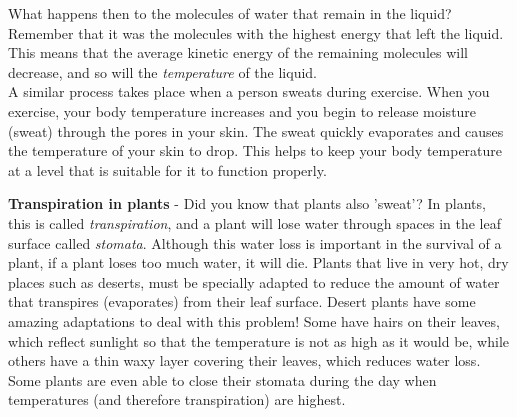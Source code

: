 \begin{itemize}
{What happens then to the molecules of water that remain in the liquid? Remember that it was the molecules with the highest energy that left the liquid. This means that the average kinetic energy of the remaining molecules will decrease, and so will the \textit{temperature} of the liquid.\\

A similar process takes place when a person sweats during exercise. When you exercise, your body temperature increases and you begin to release moisture (sweat) through the pores in your skin. The sweat quickly evaporates and causes the temperature of your skin to drop. This helps to keep your body temperature at a level that is suitable for it to function properly.}
\end{itemize}

\begin{IFact}{\textbf{Transpiration in plants} - Did you know that plants also 'sweat'? In plants, this is called \textit{transpiration}, and a plant will lose water through spaces in the leaf surface called \textit{stomata}. Although this water loss is important in the survival of a plant, if a plant loses too much water, it will die. Plants that live in very hot, dry places such as deserts, must be specially adapted to reduce the amount of water that transpires (evaporates) from their leaf surface. Desert plants have some amazing adaptations to deal with this problem! Some have hairs on their leaves, which reflect sunlight so that the temperature is not as high as it would be, while others have a thin waxy layer covering their leaves, which reduces water loss. Some plants are even able to close their stomata during the day when temperatures (and therefore transpiration) are highest.}
\end{IFact}




